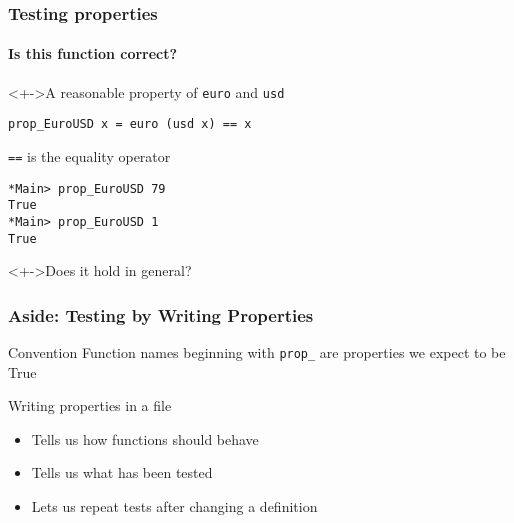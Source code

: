 \documentclass{beamer}
\begin{document}
\begin{frame}[fragile]
  \frametitle{Testing properties}
  \framesubtitle{Is this function correct?}
  \begin{block}<+->{A reasonable property of \texttt{euro} and \texttt{usd}}
\begin{verbatim}
prop_EuroUSD x = euro (usd x) == x
\end{verbatim}
    \texttt{==} is the equality operator
\begin{verbatim}
*Main> prop_EuroUSD 79
True
*Main> prop_EuroUSD 1
True
\end{verbatim}
  \end{block}
  \begin{alertblock}<+->{Does it hold in general?}
    
  \end{alertblock}
\end{frame}
\begin{frame}[fragile]
  \frametitle{Aside: Testing by Writing Properties}
  \begin{block}{Convention}
    Function names beginning with
    \verb|prop_| are properties we expect to be True 
  \end{block}
  \begin{block}{Writing properties in a file}
    \begin{itemize}
    \item Tells us how functions should behave 
    \item Tells us what has been tested 
    \item Lets us repeat tests after changing a definition 
    \end{itemize}
  \end{block}
\end{frame}
\end{document}
